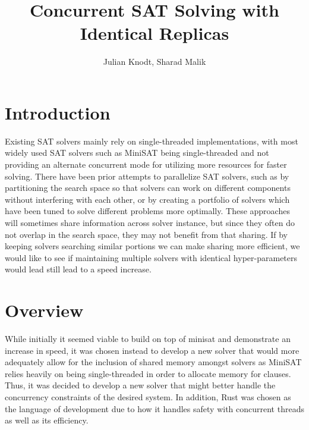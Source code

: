 \documentclass[11pt]{extarticle}
\title{Concurrent SAT Solving with Identical Replicas}
\author{Julian Knodt, Sharad Malik}
\date{}
\begin{document}
\maketitle


\section*{Introduction}
Existing SAT solvers mainly rely on single-threaded implementations, with most widely used SAT
solvers such as MiniSAT being single-threaded and not providing an alternate concurrent mode for
utilizing more resources for faster solving. There have been prior attempts to parallelize SAT
solvers, such as by partitioning the search space so that solvers can work on different
components without interfering with each other, or by creating a portfolio of solvers which have
been tuned to solve different problems more optimally. These approaches will sometimes share
information across solver instance, but since they often do not overlap in the search space,
they may not benefit from that sharing. If by keeping solvers searching similar portions we can
make sharing more efficient, we would like to see if maintaining multiple solvers with identical
hyper-parameters would lead still lead to a speed increase.
\section*{Overview}
While initially it seemed viable to build on top of minisat and demonstrate an increase in
speed, it was chosen instead to develop a new solver that would more adequately allow for the
inclusion of shared memory amongst solvers as MiniSAT relies heavily on being single-threaded in
order to allocate memory for clauses. Thus, it was decided to develop a new solver that might
better handle the concurrency constraints of the desired system. In addition, Rust was chosen as
the language of development due to how it handles safety with concurrent threads as well as its
efficiency.

\end{document}
